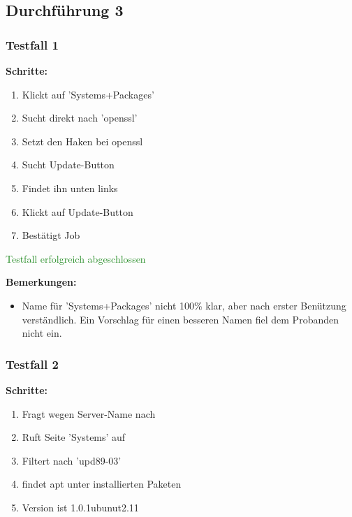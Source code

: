 \subsection*{Durchführung 3}



\subsubsection*{Testfall 1}

\textbf{Schritte:}

\begin{enumerate}
    \item Klickt auf 'Systems+Packages'
    \item Sucht direkt nach 'openssl'
    \item Setzt den Haken bei openssl
    \item Sucht Update-Button
    \item Findet ihn unten links
    \item Klickt auf Update-Button
    \item Bestätigt Job
\end{enumerate}

\textcolor{ForestGreen}{Testfall erfolgreich abgeschlossen}

\bigskip
\textbf{Bemerkungen:}

\begin{itemize}[noitemsep,nolistsep]
    \item Name für 'Systems+Packages' nicht 100\% klar, aber nach erster Benützung verständlich. Ein Vorschlag für einen besseren Namen fiel dem Probanden nicht ein.
\end{itemize}


\subsubsection*{Testfall 2}

\textbf{Schritte:}

\begin{enumerate}
    \item Fragt wegen Server-Name nach
    \item Ruft Seite 'Systems' auf
    \item Filtert nach 'upd89-03'
    \item findet apt unter installierten Paketen
    \item Version ist 1.0.1ubunut2.11
\end{enumerate}

